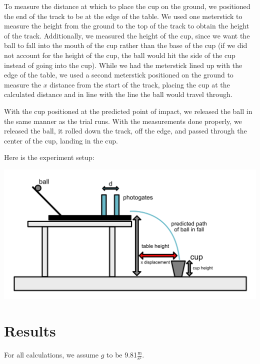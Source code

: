 \documentclass[12pt]{article}
\begin{document}
To measure the distance at which to place the cup on the ground, we positioned the end of the track to be at the edge of the table. We used one meterstick to measure the height from the ground to the top of the track to obtain the height of the track. Additionally, we measured the height of the cup, since we want the ball to fall into the mouth of the cup rather than the base of the cup (if we did not account for the height of the cup, the ball would hit the side of the cup instead of going into the cup). While we had the meterstick lined up with the edge of the table, we used a second meterstick positioned on the ground to measure the \(x\) distance from the start of the track, placing the cup at the calculated distance and in line with the line the ball would travel through.

With the cup positioned at the predicted point of impact, we released the ball in the same manner as the trial runs. With the measurements done properly, we released the ball, it rolled down the track, off the edge, and passed through the center of the cup, landing in the cup.

Here is the experiment setup:

\begin{center}
\includegraphics[width=6in]{./projectilesetup.png}
\end{center}
\section{Results}
\label{sec:org4cfcaba}

For all calculations, we assume \(g\) to be 9.81\(\frac{\text{m}}{\text{s}^{2}}\).
\end{document}
